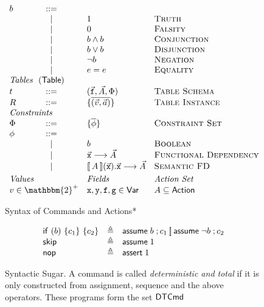 \begin{figure}[ht]
\[\begin{array}{l c l l}
      b & ::= & \\
        & \mid & \TRUE & \textsc{Truth} \\
        & \mid & \FALSE & \textsc{Falsity} \\
        & \mid & b \wedge b & \textsc{Conjunction} \\
        & \mid & b \vee b & \textsc{Disjunction} \\
        & \mid & \neg b & \textsc{Negation} \\ 
        & \mid & e = e & \textsc{Equality} \\
      \multicolumn 4 l {\textit{Tables}~~(\Table)}\\
      t & ::= & (\vec{\var f}, \vec A, \Phi) & \textsc{Table Schema}\\
      R & ::= & \{\overline{(\vec v, \vec a)}\} & \textsc{Table Instance} \\      
      \multicolumn 4 l {\textit{Constraints}}\\
      \Phi & ::= &\{\overline{\phi} \} & \textsc{Constraint Set}\\
      \phi & ::= & \\
        & \mid & b & \textsc{Boolean} \\
        & \mid & \vec {\var x} \longrightarrow \vec A & \textsc{Functional Dependency}\\
        & \mid & \bracbb{A}(\vec{\var x}).\vec{\var x} \longrightarrow \vec A  & \textsc{Semantic FD} \\[.3em]
      \multicolumn{2}{l}{\textit{Values}} & \textit{Fields} & \textit{Action Set}\\
      \multicolumn{2}{l}{v \in \mathbbm{2}^+} & \var x, \var y, \var f, \var g \in \mathsf{Var} & A \subseteq \Action
    \end{array}\]
  \caption{Syntax of Commands and Actions*}
  \label{fig:syntax}
\end{figure}

\begin{figure}[ht]
  \[\begin{array}{lcl}
      \mathsf{if}~(b)~\{c_1\}~\{c_2\} & \triangleq & \mathsf{assume}\; b\;;c_1 \operatorname*{\left[\!\right]} \mathsf{assume}\; \neg b\;; c_2 \\
      \mathsf{skip} & \triangleq& \mathsf{assume}\; 1\; \\
      \mathsf{nop} & \triangleq & \mathsf{assert}\; 1\;
    \end{array}
  \]
  \caption{Syntactic Sugar. A command is called \emph{deterministic
      and total} if it is only constructed from assignment, sequence
    and the above operators. These programs form the set $\mathsf{DTCmd}$}
  \label{fig:sugar}
\end{figure}

